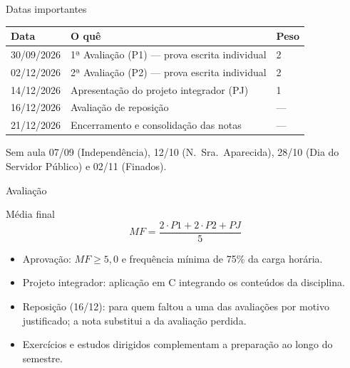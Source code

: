 \documentclass[aspectratio=169]{beamer}
\begin{document}
\begin{frame}{Datas importantes}
  \begin{center}
  \begin{tabular}{lll}
    \toprule
    Data & O quê & Peso \\
    \midrule
    30/09/2026 & 1ª Avaliação (P1) — prova escrita individual & 2 \\
    02/12/2026 & 2ª Avaliação (P2) — prova escrita individual & 2 \\
    14/12/2026 & Apresentação do projeto integrador (PJ) & 1 \\
    16/12/2026 & Avaliação de reposição & --- \\
    21/12/2026 & Encerramento e consolidação das notas & --- \\
    \bottomrule
  \end{tabular}
  \end{center}
  \begin{alertblock}{Sem aula}
    07/09 (Independência), 12/10 (N.\ Sra.\ Aparecida), 28/10 (Dia do
    Servidor Público) e 02/11 (Finados).
  \end{alertblock}
\end{frame}

\begin{frame}{Avaliação}
  \begin{block}{Média final}
    \[ MF = \frac{2 \cdot P1 + 2 \cdot P2 + PJ}{5} \]
  \end{block}
  \begin{itemize}
    \item Aprovação: $MF \geq 5{,}0$ e frequência mínima de 75\% da carga horária.
    \item Projeto integrador: aplicação em C integrando os conteúdos da disciplina.
    \item Reposição (16/12): para quem faltou a uma das avaliações por motivo
      justificado; a nota substitui a da avaliação perdida.
    \item Exercícios e estudos dirigidos complementam a preparação ao longo do semestre.
  \end{itemize}
\end{frame}
\end{document}
